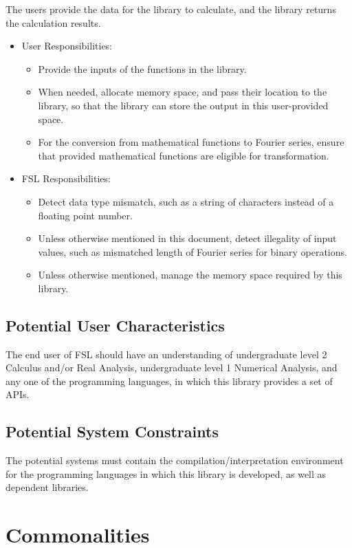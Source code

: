 \documentclass[12pt]{article}
\newcommand{\famname}{FSL} %
\begin{document}
The users provide the data for the library to  calculate, and the library 
returns the calculation results.
\begin{itemize}
\item User Responsibilities:
\begin{itemize}
\item Provide the inputs of the functions in the library.
\item When needed, allocate memory space, and pass their location to the library, so that the library can store the output in this user-provided space.
\item For the conversion from mathematical functions to Fourier series, 
ensure that provided mathematical functions are eligible for transformation. 
\end{itemize}
\item \famname{} Responsibilities:
\begin{itemize}
\item Detect data type mismatch, such as a string of characters 
instead of a floating point number.
\item Unless otherwise mentioned in this document, detect illegality 
of input values, such as mismatched length of Fourier series 
for binary operations.
\item Unless otherwise mentioned, manage the memory space 
required by this library.
\end{itemize}
\end{itemize}

\subsection{Potential User Characteristics} \label{SecUserCharacteristics}

The end user of \famname{} should have an understanding of undergraduate 
level 2 Calculus and/or Real Analysis, undergraduate level 1 Numerical 
Analysis, and any one of the programming languages, in which this library 
provides a set of APIs.

\subsection{Potential System Constraints}
The potential systems must contain the compilation/interpretation environment 
for the programming languages in which this library is developed, as well 
as dependent libraries.

\section{Commonalities}\label{Sc:CA}
\end{document}
